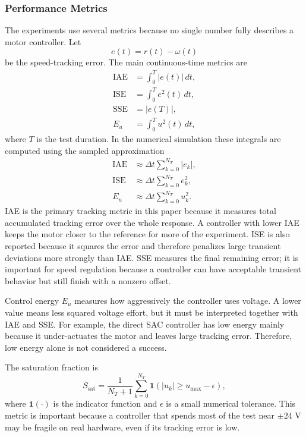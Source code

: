 \documentclass[conference]{IEEEtran}
\begin{document}
\subsubsection{Performance Metrics}
The experiments use several metrics because no single number fully describes a motor controller. Let
\begin{equation}
e(t)=r(t)-\omega(t)
\end{equation}
be the speed-tracking error. The main continuous-time metrics are
\begin{align}
\mathrm{IAE} &= \int_0^T |e(t)|\,dt, \\
\mathrm{ISE} &= \int_0^T e^2(t)\,dt, \\
\mathrm{SSE} &= |e(T)|, \\
E_u &= \int_0^T u^2(t)\,dt,
\end{align}
where $T$ is the test duration. In the numerical simulation these integrals are computed using the sampled approximation
\begin{align}
\mathrm{IAE} &\approx \Delta t \sum_{k=0}^{N_T} |e_k|, \\
\mathrm{ISE} &\approx \Delta t \sum_{k=0}^{N_T} e_k^2, \\
E_u &\approx \Delta t \sum_{k=0}^{N_T} u_k^2.
\end{align}
IAE is the primary tracking metric in this paper because it measures total accumulated tracking error over the whole response. A controller with lower IAE keeps the motor closer to the reference for more of the experiment. ISE is also reported because it squares the error and therefore penalizes large transient deviations more strongly than IAE. SSE measures the final remaining error; it is important for speed regulation because a controller can have acceptable transient behavior but still finish with a nonzero offset.

Control energy $E_u$ measures how aggressively the controller uses voltage. A lower value means less squared voltage effort, but it must be interpreted together with IAE and SSE. For example, the direct SAC controller has low energy mainly because it under-actuates the motor and leaves large tracking error. Therefore, low energy alone is not considered a success.

The saturation fraction is
\begin{equation}
S_{\mathrm{sat}} =
\frac{1}{N_T+1}
\sum_{k=0}^{N_T}
\mathbf{1}\left(|u_k| \geq u_{\max}-\epsilon\right),
\end{equation}
where $\mathbf{1}(\cdot)$ is the indicator function and $\epsilon$ is a small numerical tolerance. This metric is important because a controller that spends most of the test near $\pm 24$ V may be fragile on real hardware, even if its tracking error is low.
\end{document}

